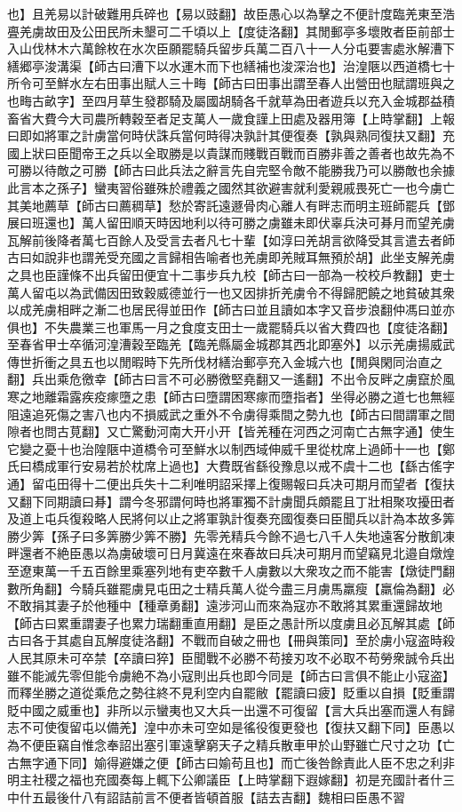 也】且羌易以計破難用兵碎也【易以豉翻】故臣愚心以為擊之不便計度臨羌東至浩亹羌虜故田及公田民所未墾可二千頃以上【度徒洛翻】其閒郵亭多壞敗者臣前部士入山伐林木六萬餘枚在水次臣願罷騎兵留步兵萬二百八十一人分屯要害處氷解漕下繕郷亭浚溝渠【師古曰漕下以水運木而下也繕補也浚深治也】治湟陿以西道橋七十所令可至鮮水左右田事出賦人三十畮【師古曰田事出謂至春人出營田也賦謂班與之也畮古畝字】至四月草生發郡騎及屬國胡騎各千就草為田者遊兵以充入金城郡益積畜省大費今大司農所轉穀至者足支萬人一歲食謹上田處及器用簿【上時掌翻】上報曰即如將軍之計虜當何時伏誅兵當何時得决孰計其便復奏【孰與熟同復扶又翻】充國上狀曰臣聞帝王之兵以全取勝是以貴謀而賤戰百戰而百勝非善之善者也故先為不可勝以待敵之可勝【師古曰此兵法之辭言先自完堅令敵不能勝我乃可以勝敵也余據此言本之孫子】蠻夷習俗雖殊於禮義之國然其欲避害就利愛親戚畏死亡一也今虜亡其美地薦草【師古曰薦稠草】愁於寄託遠遯骨肉心離人有畔志而明主班師罷兵【鄧展曰班還也】萬人留田順天時因地利以待可勝之虜雖未即伏辜兵決可朞月而望羌虜瓦解前後降者萬七百餘人及受言去者凡七十輩【如淳曰羌胡言欲降受其言遣去者師古曰如說非也謂羌受充國之言歸相告喻者也羌虜即羌賊耳無預於胡】此坐支解羌虜之具也臣謹條不出兵留田便宜十二事步兵九校【師古曰一部為一校校戶教翻】吏士萬人留屯以為武備因田致穀威德並行一也又因排折羌虜令不得歸肥饒之地貧破其衆以成羌虜相畔之漸二也居民得並田作【師古曰並且讀如本字又音步浪翻仲馮曰並亦俱也】不失農業三也軍馬一月之食度支田士一歲罷騎兵以省大費四也【度徒洛翻】至春省甲士卒循河湟漕穀至臨羌【臨羌縣屬金城郡其西北即塞外】以示羌虜揚威武傳世折衝之具五也以閒暇時下先所伐材繕治郵亭充入金城六也【閒與閑同治直之翻】兵出乘危徼幸【師古曰言不可必勝徼堅堯翻又一遙翻】不出令反畔之虜竄於風寒之地離霜露疾疫瘃墮之患【師古曰墮謂困寒瘃而墮指者】坐得必勝之道七也無經阻遠追死傷之害八也内不損威武之重外不令虜得乘間之勢九也【師古曰間謂軍之間隙者也問古莧翻】又亡驚動河南大开小开【皆羌種在河西之河南亡古無字通】使生它變之憂十也治隍陿中道橋令可至鮮水以制西域伸威千里從枕席上過師十一也【鄭氏曰橋成軍行安易若於枕席上過也】大費既省繇役豫息以戒不虞十二也【繇古傜字通】留屯田得十二便出兵失十二利唯明詔采擇上復賜報曰兵决可期月而望者【復扶又翻下同期讀曰朞】謂今冬邪謂何時也將軍獨不計虜聞兵頗罷且丁壯相聚攻擾田者及道上屯兵復殺略人民將何以止之將軍孰計復奏充國復奏曰臣聞兵以計為本故多筭勝少筭【孫子曰多筭勝少筭不勝】先零羌精兵今餘不過七八千人失地遠客分散飢凍畔還者不絶臣愚以為虜破壞可日月冀遠在來春故曰兵决可期月而望竊見北邉自燉煌至遼東萬一千五百餘里乘塞列地有吏卒數千人虜數以大衆攻之而不能害【燉徒門翻數所角翻】今騎兵雖罷虜見屯田之士精兵萬人從今盡三月虜馬羸瘦【羸倫為翻】必不敢捐其妻子於他種中【種章勇翻】遠涉河山而來為寇亦不敢將其累重還歸故地【師古曰累重謂妻子也累力瑞翻重直用翻】是臣之愚計所以度虜且必瓦解其處【師古曰各于其處自瓦解度徒洛翻】不戰而自破之冊也【冊與策同】至於虜小寇盗時殺人民其原未可卒禁【卒讀曰猝】臣聞戰不必勝不苟接刃攻不必取不苟勞衆誠令兵出雖不能滅先零但能令虜絶不為小寇則出兵也即今同是【師古曰言俱不能止小寇盗】而釋坐勝之道從乘危之勢往終不見利空内自罷敝【罷讀曰疲】貶重以自損【貶重謂貶中國之威重也】非所以示蠻夷也又大兵一出還不可復留【言大兵出塞而還人有歸志不可使復留屯以備羌】湟中亦未可空如是徭役復更發也【復扶又翻下同】臣愚以為不便臣竊自惟念奉詔出塞引軍遠擊窮天子之精兵散車甲於山野雖亡尺寸之功【亡古無字通下同】媮得避嫌之便【師古曰媮苟且也】而亡後咎餘責此人臣不忠之利非明主社稷之福也充國奏每上輒下公卿議臣【上時掌翻下遐嫁翻】初是充國計者什三中什五最後什八有詔詰前言不便者皆頓首服【詰去吉翻】魏相曰臣愚不習